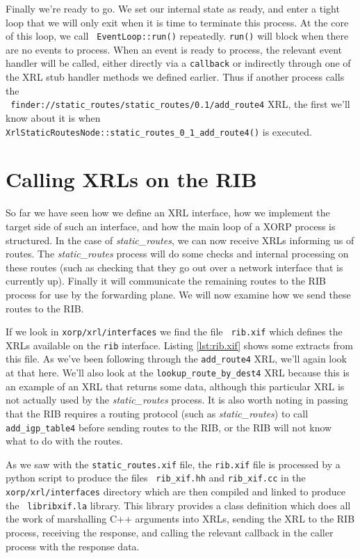\documentclass[11pt]{article}
\newcommand{\stt}{\tt\small}
\newcommand{\SRI}{{\it static\_routes}\xspace}
\begin{document}
Finally we're ready to go.  We set our internal state as ready, and
enter a tight loop that we will only exit when it is time to terminate
this process.  At the core of this loop, we call {\stt
EventLoop::run()} repeatedly.  {\stt run()} will block when there are
no events to process.  When an event is ready to process, the relevant
event handler will be called, either directly via a {\stt callback} or
indirectly through one of the XRL stub handler methods we defined
earlier.  Thus if another process calls the \\{\stt
  finder://static\_routes/static\_routes/0.1/add\_route4} XRL, the
first we'll know about it is when {\stt
  XrlStaticRoutesNode::static\_routes\_0\_1\_add\_route4()} is executed.

\newpage
\section{Calling XRLs on the RIB}
\label{rib}

So far we have seen how we define an XRL interface, how we implement
the target side of such an interface, and how the main loop of a XORP
process is structured.  In the case of \SRI, we can now receive XRLs
informing us of routes.  The \SRI process will do some checks and
internal processing on these routes (such as checking that they go out
over a network interface that is currently up).  Finally it will
communicate the remaining routes to the RIB process for use by the
forwarding plane.  We will now examine how we send these routes to the
RIB.

If we look in {\stt xorp/xrl/interfaces} we find the file {\stt
rib.xif} which defines the XRLs available on the {\stt rib} interface.
Listing \ref{lst:rib.xif} shows some extracts from this file.  As
we've been following through the {\stt add\_route4} XRL, we'll again
look at that here.  We'll also look at the {\stt lookup\_route\_by\_dest4}
XRL because this is an example of an XRL that returns some data, although
this particular XRL is not actually used by the \SRI process. It is
also worth noting in passing that the RIB requires a routing protocol
(such as \SRI) to call {\stt add\_igp\_table4} before sending routes
to the RIB, or the RIB will not know what to do with the routes.

As we saw with the {\stt static\_routes.xif} file, the {\stt rib.xif}
file is processed by a python script to produce the files {\stt
rib\_xif.hh} and {\stt rib\_xif.cc} in the {\stt xorp/xrl/interfaces}
directory which are then compiled and linked to produce the {\stt
libribxif.la} library.  This library provides a class definition which
does all the work of marshalling C++ arguments into XRLs, sending the
XRL to the RIB process,  receiving the response, and calling the
relevant callback in the caller process with the response data.
\end{document}
